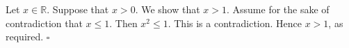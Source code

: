 Let $x \in \mathbb{R}$.
Suppose that $x > 0$.
We show that $x > 1$.
Assume for the sake of contradiction that $x \leq 1$.
Then $x^{2} \leq 1$.
This is a contradiction.
Hence $x > 1$, as required. \hfill$\square$